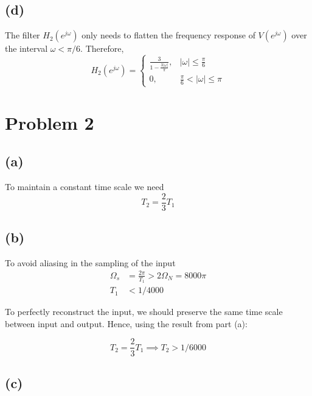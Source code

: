 \documentclass{article}
\begin{document}
\subsection{(d)}

\resizebox{\linewidth}{!}{}

The filter $H_2(e^{j\omega})$ only needs to flatten the frequency response of $V(e^{j\omega})$ over the interval $\omega < \pi/6$. Therefore,
\begin{equation}
H_2(e^{j\omega}) = \begin{cases}
\frac{3}{1 - \displaystyle\frac{3|\omega|}{\pi}}, & |\omega|\leq \frac{\pi}{6} \\
0, & \frac{\pi}{6} < |\omega|\leq \pi
\end{cases}
\end{equation}

\section{Problem 2}
\subsection{(a)}

To maintain a constant time scale we need
\begin{equation}
T_2 = \frac{2}{3}T_1
\end{equation}

\subsection{(b)}

To avoid aliasing in the sampling of the input
\begin{align}
\Omega_s &= \frac{2\pi}{T_1} > 2\Omega_N = 8000\pi \\
T_1 &< 1/4000
\end{align}

To perfectly reconstruct the input, we should preserve the same time scale between input and output. Hence, using the result from part (a):

\begin{equation}
T_2 = \frac{2}{3}T_1 \implies T_2 > 1/6000
\end{equation}

\subsection{(c)}
\begin{center}
	\resizebox{0.8\linewidth}{!}{}
\end{center}
\end{document}
